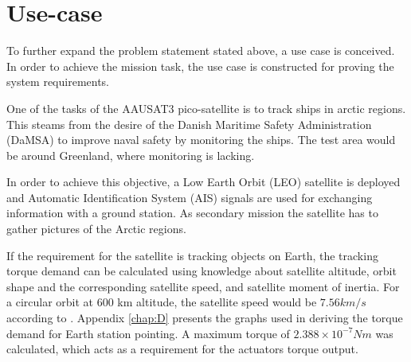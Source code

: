 \section{Use-case}\label{sec:useCase}
To further expand the problem statement stated above, a use case is conceived. In order to achieve the mission task, the use case is constructed for proving the system requirements.

One of the tasks of the AAUSAT3 pico-satellite is to track ships in arctic regions. This steams from the desire of the Danish Maritime Safety Administration (DaMSA) to improve naval safety by monitoring the ships. The test area would be around Greenland, where monitoring is lacking. %

In order to achieve this objective, a Low Earth Orbit  (LEO)  satellite is deployed and Automatic Identification System (AIS) signals are used for exchanging information with a ground station. As secondary mission the satellite has to gather pictures of the Arctic regions.

If the requirement for the satellite is tracking objects on Earth, the tracking torque demand can be calculated using knowledge about satellite altitude, orbit shape and the corresponding satellite speed, and satellite moment of inertia. For a circular orbit at 600 km altitude, the satellite speed would be $7.56 km/s$  according to \cite{satSpeed}. Appendix \ref{chap:D} presents the graphs used in deriving the torque demand for Earth station pointing. A maximum torque of ${2.388 \times 10^{-7} Nm}$ was calculated, which acts as a requirement for the actuators torque output.
